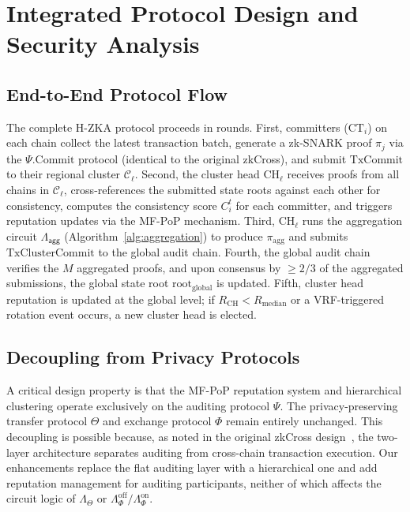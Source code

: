 \documentclass[journal]{IEEEtran}
\newcommand{\aggCircuit}{\Lambda_{\mathsf{agg}}}
\begin{document}
\section{Integrated Protocol Design and Security Analysis}

\subsection{End-to-End Protocol Flow}

The complete H-ZKA protocol proceeds in rounds. First, committers ($\text{CT}_i$) on each chain collect the latest transaction batch, generate a zk-SNARK proof $\pi_j$ via the $\Psi.\text{Commit}$ protocol (identical to the original zkCross), and submit $\text{TxCommit}$ to their regional cluster $\mathcal{C}_\ell$. Second, the cluster head $\text{CH}_\ell$ receives proofs from all chains in $\mathcal{C}_\ell$, cross-references the submitted state roots against each other for consistency, computes the consistency score $C_i^t$ for each committer, and triggers reputation updates via the MF-PoP mechanism. Third, $\text{CH}_\ell$ runs the aggregation circuit $\aggCircuit$ (Algorithm~\ref{alg:aggregation}) to produce $\pi_{\text{agg}}$ and submits $\text{TxClusterCommit}$ to the global audit chain. Fourth, the global audit chain verifies the $M$ aggregated proofs, and upon consensus by $\geq 2/3$ of the aggregated submissions, the global state root $\text{root}_{\text{global}}$ is updated. Fifth, cluster head reputation is updated at the global level; if $R_{\text{CH}} < R_{\text{median}}$ or a VRF-triggered rotation event occurs, a new cluster head is elected.

\subsection{Decoupling from Privacy Protocols}

A critical design property is that the MF-PoP reputation system and hierarchical clustering operate exclusively on the auditing protocol $\Psi$. The privacy-preserving transfer protocol $\Theta$ and exchange protocol $\Phi$ remain entirely unchanged. This decoupling is possible because, as noted in the original zkCross design~\cite{guo2024zkcross}, the two-layer architecture separates auditing from cross-chain transaction execution. Our enhancements replace the flat auditing layer with a hierarchical one and add reputation management for auditing participants, neither of which affects the circuit logic of $\Lambda_\Theta$ or $\Lambda_\Phi^{\text{off}}/\Lambda_\Phi^{\text{on}}$.
\end{document}
